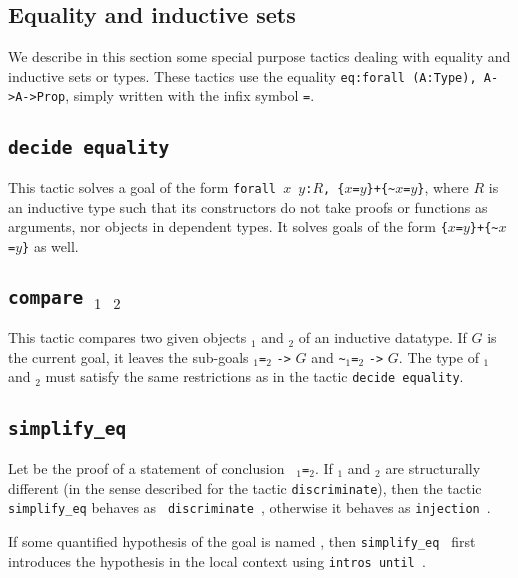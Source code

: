 \begin{coq_example*}
\section{Equality and inductive sets}

We describe in this section some special purpose tactics dealing with
equality and inductive sets or types. These tactics use the equality
{\tt eq:forall (A:Type), A->A->Prop}, simply written with the
infix symbol {\tt =}.

\subsection{\tt decide equality
\label{decideequality}
}

This tactic solves a goal of the form
{\tt forall $x$ $y$:$R$, \{$x$=$y$\}+\{\verb|~|$x$=$y$\}}, where $R$
is an inductive type such that its constructors do not take proofs or
functions as arguments, nor objects in dependent types.
It solves goals of the form {\tt \{$x$=$y$\}+\{\verb|~|$x$=$y$\}} as well.

\subsection{\tt compare \term$_1$ \term$_2$
}

This tactic compares two given objects \term$_1$ and \term$_2$
of an inductive datatype. If $G$ is the current goal, it leaves the sub-goals
\term$_1${\tt =}\term$_2$ {\tt ->} $G$ and \verb|~|\term$_1${\tt =}\term$_2$
{\tt ->} $G$. The type
of \term$_1$ and \term$_2$ must satisfy the same restrictions as in the tactic
\texttt{decide equality}.

\subsection{\tt simplify\_eq {\term}
\label{simplify-eq}}

Let {\term} be the proof of a statement of conclusion {\tt
  {\term$_1$}={\term$_2$}}. If {\term$_1$} and
{\term$_2$} are structurally different (in the sense described for the
tactic {\tt discriminate}), then the tactic {\tt simplify\_eq} behaves as {\tt
  discriminate {\term}}, otherwise it behaves as {\tt injection
  {\term}}.

\Rem If some quantified hypothesis of the goal is named {\ident}, then
{\tt simplify\_eq {\ident}} first introduces the hypothesis in the local
context using \texttt{intros until \ident}.


\end{coq_example*}
